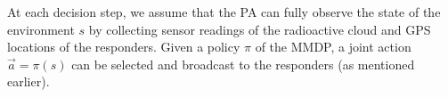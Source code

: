 At each decision step, we assume that the PA can fully observe the
state of the environment $s$ by collecting sensor readings of the
radioactive cloud and GPS locations of the responders. Given a
policy $\pi$ of the MMDP, a joint action $\vec{a}=\pi(s)$ can be
selected and broadcast to the responders (as mentioned earlier).
